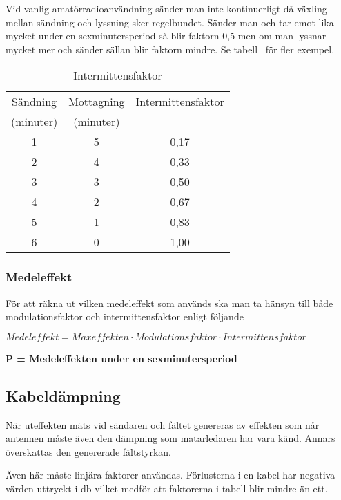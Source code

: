 Vid vanlig amatörradioanvändning sänder man inte kontinuerligt då växling
mellan sändning och lyssning sker regelbundet.
Sänder man och tar emot lika mycket under en sexminutersperiod så blir faktorn
0,5 men om man lyssnar mycket mer och sänder sällan blir faktorn mindre.
Se tabell~ för fler exempel.

\begin{table}[H]
  \begin{center}
    \begin{tabular}{|c|c|c|}
	\hline
	Sändning  & Mottagning & Intermittensfaktor \\
	(minuter) & (minuter)  & \\ \hline
	1 & 5 & 0,17 \\ \hline
	2 & 4 & 0,33 \\ \hline
	3 & 3 & 0,50 \\ \hline
	4 & 2 & 0,67 \\ \hline
	5 & 1 & 0,83 \\ \hline
	6 & 0 & 1,00 \\ \hline
    \end{tabular}
    \caption{Intermittensfaktor}
    \label{tab:intfakt}
  \end{center}
\end{table}

\subsubsection{Medeleffekt}

För att räkna ut vilken medeleffekt som används ska man ta hänsyn
till både modulationsfaktor och intermittensfaktor enligt följande

\(\textit{Medeleffekt} = \textit{Maxeffekten} \cdot \textit{Modulationsfaktor} \cdot \textit{Intermittensfaktor}\)

\noindent\textbf{P = Medeleffekten under en sexminutersperiod}

\subsection{Kabeldämpning}

När uteffekten mäts vid sändaren och fältet genereras av effekten som
når antennen måste även den dämpning som matarledaren har vara känd.
Annars överskattas den genererade fältstyrkan.

Även här måste linjära faktorer användas.
Förlusterna i en kabel har negativa värden uttryckt i \unit{\decibel} vilket
medför att faktorerna i tabell  blir mindre än ett.

